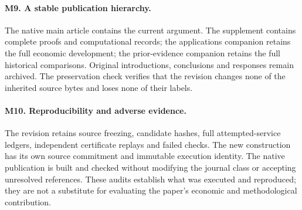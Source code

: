 \paragraph*{M9. A stable publication hierarchy.}
The native main article contains the current argument. The supplement contains
complete proofs and computational records; the applications companion retains
the full economic development; the prior-evidence companion retains the full
historical comparisons. Original introductions, conclusions and responses
remain archived. The preservation check verifies that the revision changes
none of the inherited source bytes and loses none of their labels.

\paragraph*{M10. Reproducibility and adverse evidence.}
The revision retains source freezing, candidate hashes, full attempted-service
ledgers, independent certificate replays and failed checks. The new construction
has its own source commitment and immutable execution identity. The native
publication is built and checked without modifying the journal class or
accepting unresolved references. These audits establish what was executed
and reproduced; they are not a substitute for evaluating the paper's economic
and methodological contribution.
